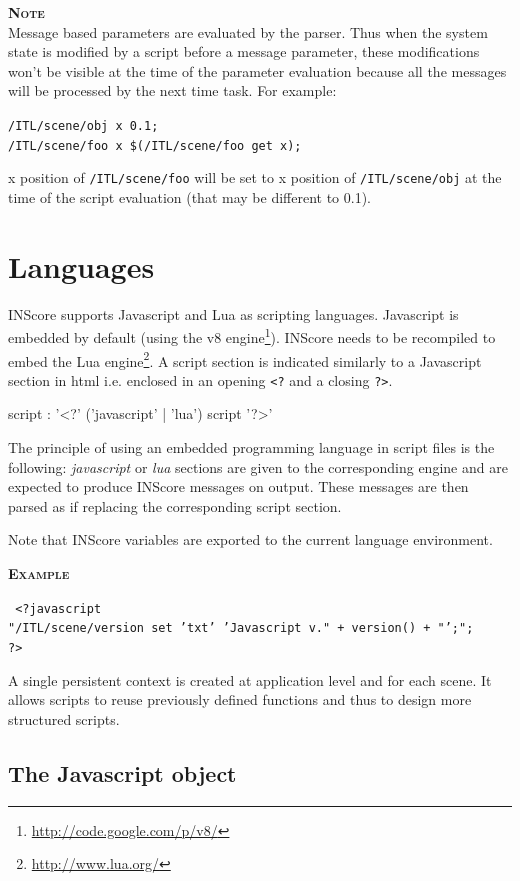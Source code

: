 \documentclass[a4paper,twoside]{report}
\newcommand{\sublevel}[1]	{\section{#1}}
\newcommand{\subsublevel}[1]	{\subsection{#1}}
\newcommand{\OSC}[1]		{\texttt{#1}}
\newcommand{\example}		{\textbf{\hspace{-1.5cm}\textbf{\textsc{Example }}}}
\newcommand{\note}	[1]		{\vspace{2mm}\textbf{\hspace{-1.03cm}\textbf{\textsc{Note #1}}}}
\newcommand{\sample}	[1]			{\vspace{-2mm}\begin{center}\colorbox{mygrey}{
								\begin{minipage}[t]{0.9\columnwidth} 
								{\small \texttt{#1}}
								\end{minipage}}\end{center}}
\begin{document}
\note{}\\
Message based parameters are evaluated by the parser. Thus when the system state is modified by a script before a message parameter, these modifications won't be visible at the time of the parameter evaluation because all the messages will be processed by the next time task. For example:\\
\sample{/ITL/scene/obj x 0.1;\\
/ITL/scene/foo x \$(/ITL/scene/foo get x);}
x position of \OSC{/ITL/scene/foo} will be set to x position of \OSC{/ITL/scene/obj} at the time of the script evaluation (that may be different to 0.1).

\sublevel{Languages}\label{scriptlang}


INScore supports Javascript and Lua as scripting languages. Javascript is embedded by default (using the v8 engine\footnote{\url{http://code.google.com/p/v8/}}). INScore needs to be recompiled to embed the Lua engine\footnote{\url{http://www.lua.org/}}. A script section is indicated similarly to a Javascript section in html i.e. enclosed in an opening \OSC{<?} and a closing \OSC{?>}.
\begin{rail} 
script : '<?' ('javascript' | 'lua') script '?>'
\end{rail}

The principle of using an embedded programming language in script files is the following: \emph{javascript} or \emph{lua} sections are given to the corresponding engine and are expected to produce INScore messages on output.
These messages are then parsed as if replacing the corresponding script section.

Note that INScore variables are exported to the current language environment.

\example
\sample{
<?javascript \\
\hspace*{3mm} "/ITL/scene/version set 'txt' 'Javascript v."  + version() + "';"; \\
\hspace*{1mm} ?>
}


A single persistent context is created at application level and for each scene.
It allows scripts to reuse previously defined functions and thus to design more structured scripts.


\subsublevel{The Javascript object}\label{jsobj}
\end{document}

